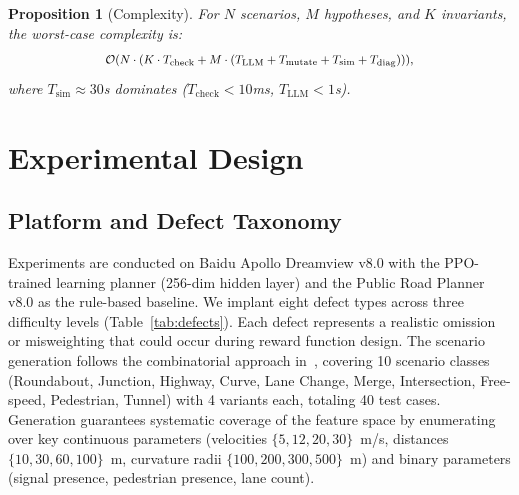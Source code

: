 \documentclass[journal]{IEEEtran}
\theoremstyle{plain}
\newtheorem{proposition}{Proposition}[section]
\newcommand{\fwleq}[1]{\begin{equation}\medmath{#1}\end{equation}}
\begin{document}
\begin{proposition}[Complexity]\label{prop:complexity}
For $N$ scenarios, $M$ hypotheses, and $K$ invariants, the worst-case complexity is:
\fwleq{\mathcal{O}(N \cdot (K \cdot T_{\text{check}} + M \cdot (T_{\text{LLM}} + T_{\text{mutate}} + T_{\text{sim}} + T_{\text{diag}}))),}
where $T_{\text{sim}} \approx 30$s dominates ($T_{\text{check}} < 10$ms, $T_{\text{LLM}} < 1$s).
\end{proposition}

\section{Experimental Design}

\subsection{Platform and Defect Taxonomy}

Experiments are conducted on Baidu Apollo Dreamview v8.0 with the PPO-trained learning planner (256-dim hidden layer) and the Public Road Planner v8.0 as the rule-based baseline. We implant eight defect types across three difficulty levels (Table~\ref{tab:defects}). Each defect represents a realistic omission or misweighting that could occur during reward function design. The scenario generation follows the combinatorial approach in~\cite{sun2022automatic,fremont2022scenic}, covering 10 scenario classes (Roundabout, Junction, Highway, Curve, Lane Change, Merge, Intersection, Free-speed, Pedestrian, Tunnel) with 4 variants each, totaling 40 test cases. Generation guarantees systematic coverage of the feature space by enumerating over key continuous parameters (velocities $\{5,12,20,30\}$~m/s, distances $\{10,30,60,100\}$~m, curvature radii $\{100,200,300,500\}$~m) and binary parameters (signal presence, pedestrian presence, lane count).
\end{document}
